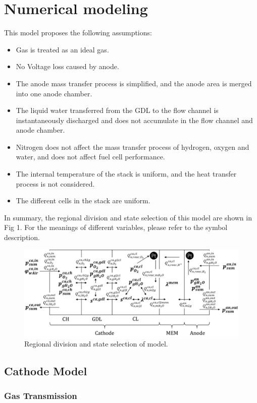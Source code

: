\section{Numerical modeling}
This model proposes the following assumptions:
\begin{itemize}
    \item Gas is treated as an ideal gas.
    \item No Voltage loss caused by anode.
    \item The anode mass transfer process is simplified, and the anode area is merged into one anode chamber.
    \item The liquid water transferred from the GDL to the flow channel is instantaneously discharged and does not accumulate in the flow channel and anode chamber.
    \item Nitrogen does not affect the mass transfer process of hydrogen, oxygen and water, and does not affect fuel cell performance.
    \item The internal temperature of the stack is uniform, and the heat transfer process is not considered.
    \item The different cells in the stack are uniform.
\end{itemize}
In summary, the regional division and state selection of this model are shown in Fig 1. For the meanings of different variables, please refer to the symbol description.
\begin{figure}[h]
    \centering
    \includegraphics{Sensor_Fusion_pictures/figure1.jpg}
    \caption{Regional division and state selection of model.}
\end{figure}
\subsection{Cathode Model}
\subsubsection{Gas Transmission}

